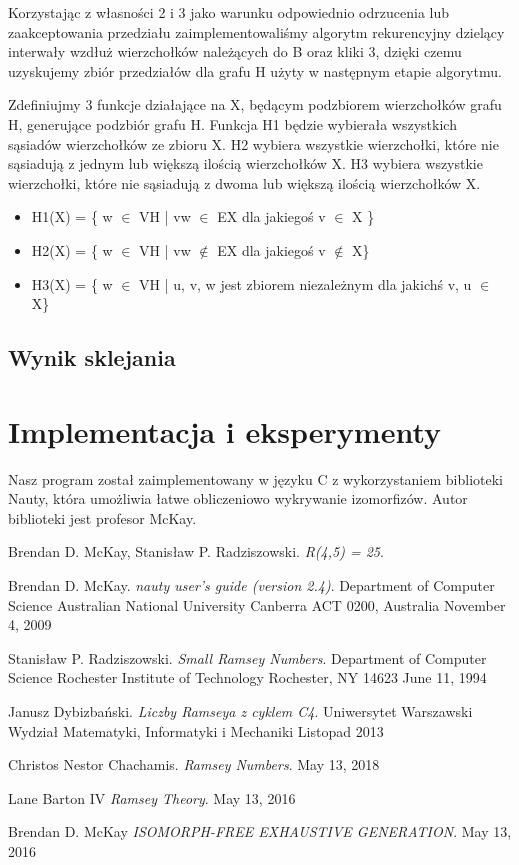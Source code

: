 \documentclass[11pt]{article}
\begin{document}
Korzystając z własności 2 i 3 jako warunku odpowiednio odrzucenia lub zaakceptowania przedziału zaimplementowaliśmy algorytm rekurencyjny dzielący interwały wzdłuż wierzchołków należących do B oraz kliki 3, dzięki czemu uzyskujemy zbiór przedziałów dla grafu H użyty w następnym etapie algorytmu.

Zdefiniujmy 3 funkcje działające na X, będącym podzbiorem wierzchołków grafu H, generujące podzbiór grafu H. 
Funkcja H1 będzie wybierała wszystkich sąsiadów wierzchołków ze zbioru X.
H2 wybiera wszystkie wierzchołki, które nie sąsiadują z jednym lub większą ilością wierzchołków X. 
H3 wybiera wszystkie wierzchołki, które nie sąsiadują z dwoma lub większą ilością wierzchołków X.
\begin{itemize}
    
  \item   H1(X) = \{ w $\in$ VH | vw $\in$ EX dla jakiegoś v $\in$ X \} 
  
  \item   H2(X) = \{ w $\in$ VH | vw $\notin$ EX dla jakiegoś v $\notin$ X\}
  
  \item   H3(X) = \{ w $\in$ VH | { u, v, w } jest zbiorem niezależnym dla jakichś v, u $\in$ X\} 
  
\end{itemize}
\subsection{Wynik sklejania}


\section{Implementacja i eksperymenty}
Nasz program został zaimplementowany w języku C z wykorzystaniem biblioteki Nauty, która umożliwia łatwe obliczeniowo wykrywanie izomorfizów.
Autor biblioteki jest profesor McKay. 

\begin{thebibliography}{9}
  Brendan D. McKay, Stanisław P. Radziszowski. 
  \textit{R(4,5) = 25}. 
  
  Brendan D. McKay.
  \textit{nauty user's guide (version 2.4)}.  
  Department of Computer Science
  Australian National University
  Canberra ACT 0200, Australia
  November 4, 2009

  Stanisław P. Radziszowski.
  \textit{Small Ramsey Numbers}.  
  Department of Computer Science Rochester Institute of Technology Rochester, NY 14623
  June 11, 1994

  Janusz Dybizbański.
  \textit{Liczby Ramseya z cyklem C4}.  
  Uniwersytet Warszawski
  Wydział Matematyki, Informatyki i Mechaniki
  Listopad 2013

  Christos Nestor Chachamis.
  \textit{Ramsey Numbers}.  
  May 13, 2018

  Lane Barton IV
  \textit{Ramsey Theory}.  
  May 13, 2016

  Brendan D. McKay
  \textit{ISOMORPH-FREE EXHAUSTIVE GENERATION}.  
  May 13, 2016

  \end{thebibliography}
\end{document}
